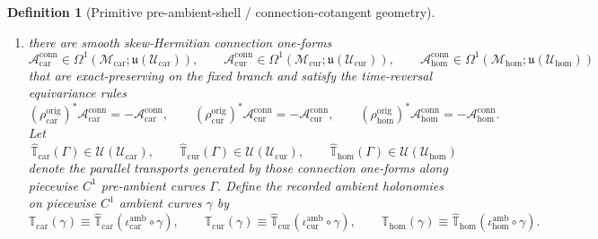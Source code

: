 \documentclass[11pt]{article}
\newcommand{\RootTensorClass}{\mathscr U_{\mathrm{car}}}
\newcommand{\RootRelabelClass}{\mathscr U_{\mathrm{cur}}}
\newcommand{\RootFreeClass}{\mathscr U_{\mathrm{hom}}}
\newcommand{\TensorAmbientLiouville}{\boldsymbol{\Lambda}_{\mathrm{car}}}
\newcommand{\CurAmbientLiouville}{\boldsymbol{\Lambda}_{\mathrm{cur}}}
\newcommand{\HomAmbientLiouville}{\boldsymbol{\Lambda}_{\mathrm{hom}}}
\newcommand{\TensorAmbientTwo}{\boldsymbol{\Xi}_{\mathrm{car}}}
\newcommand{\CurAmbientTwo}{\boldsymbol{\Xi}_{\mathrm{cur}}}
\newcommand{\HomAmbientTwo}{\boldsymbol{\Xi}_{\mathrm{hom}}}
\newcommand{\TensorAmbientTransport}{\mathbb T_{\mathrm{car}}}
\newcommand{\CurAmbientTransport}{\mathbb T_{\mathrm{cur}}}
\newcommand{\HomAmbientTransport}{\mathbb T_{\mathrm{hom}}}
\newcommand{\TensorOriginSpace}{\mathcal M_{\mathrm{car}}}
\newcommand{\CurOriginSpace}{\mathcal M_{\mathrm{cur}}}
\newcommand{\HomOriginSpace}{\mathcal M_{\mathrm{hom}}}
\newcommand{\TensorOriginTimeRev}{\rho_{\mathrm{car}}^{\mathrm{orig}}}
\newcommand{\CurOriginTimeRev}{\rho_{\mathrm{cur}}^{\mathrm{orig}}}
\newcommand{\HomOriginTimeRev}{\rho_{\mathrm{hom}}^{\mathrm{orig}}}
\newcommand{\TensorAmbientInc}{\iota_{\mathrm{car}}^{\mathrm{amb}}}
\newcommand{\CurAmbientInc}{\iota_{\mathrm{cur}}^{\mathrm{amb}}}
\newcommand{\HomAmbientInc}{\iota_{\mathrm{hom}}^{\mathrm{amb}}}
\newcommand{\HomOriginCotangentRealization}{\widehat\Psi_{\mathrm{hom}}}
\newcommand{\TensorOriginLiouville}{\boldsymbol{\Lambda}_{\mathrm{car}}^{\mathrm{orig}}}
\newcommand{\CurOriginLiouville}{\boldsymbol{\Lambda}_{\mathrm{cur}}^{\mathrm{orig}}}
\newcommand{\HomOriginLiouville}{\boldsymbol{\Lambda}_{\mathrm{hom}}^{\mathrm{orig}}}
\newcommand{\TensorOriginTwo}{\boldsymbol{\Xi}_{\mathrm{car}}^{\mathrm{orig}}}
\newcommand{\CurOriginTwo}{\boldsymbol{\Xi}_{\mathrm{cur}}^{\mathrm{orig}}}
\newcommand{\HomOriginTwo}{\boldsymbol{\Xi}_{\mathrm{hom}}^{\mathrm{orig}}}
\newcommand{\TensorConnectionForm}{\mathcal A_{\mathrm{car}}^{\mathrm{conn}}}
\newcommand{\CurConnectionForm}{\mathcal A_{\mathrm{cur}}^{\mathrm{conn}}}
\newcommand{\HomConnectionForm}{\mathcal A_{\mathrm{hom}}^{\mathrm{conn}}}
\newcommand{\TensorOriginTransport}{\widehat{\mathbb T}_{\mathrm{car}}}
\newcommand{\CurOriginTransport}{\widehat{\mathbb T}_{\mathrm{cur}}}
\newcommand{\HomOriginTransport}{\widehat{\mathbb T}_{\mathrm{hom}}}
\newcommand{\LieU}{\mathfrak u}
\newtheorem{definition}{Definition}
\begin{document}
\begin{definition}[Primitive pre-ambient-shell / connection-cotangent geometry]
\begin{enumerate}
\begin{equation}
    \HomOriginLiouville\equiv{\HomOriginCotangentRealization}^*\theta_{\mathrm{can}},
    \label{eq:origin_liouville}
    \end{equation}
    \begin{equation}
    \TensorOriginTwo\equiv d\TensorOriginLiouville,\qquad
    \CurOriginTwo\equiv d\CurOriginLiouville,\qquad
    \HomOriginTwo\equiv d\HomOriginLiouville.
    \label{eq:origin_two}
    \end{equation}
    Assume
    \[
    (\TensorOriginTimeRev)^*\TensorOriginLiouville=-\TensorOriginLiouville,\qquad
    (\CurOriginTimeRev)^*\CurOriginLiouville=-\CurOriginLiouville,\qquad
    (\HomOriginTimeRev)^*\HomOriginLiouville=-\HomOriginLiouville.
    \]
    Define the recorded ambient Liouville one-forms and closed two-forms by ambient restriction:
    \begin{equation}
    \TensorAmbientLiouville\equiv(\TensorAmbientInc)^*\TensorOriginLiouville,\qquad
    \CurAmbientLiouville\equiv(\CurAmbientInc)^*\CurOriginLiouville,\qquad
    \HomAmbientLiouville\equiv(\HomAmbientInc)^*\HomOriginLiouville,
    \label{eq:ambient_liouville_from_origin}
    \end{equation}
    \begin{equation}
    \TensorAmbientTwo\equiv(\TensorAmbientInc)^*\TensorOriginTwo,\qquad
    \CurAmbientTwo\equiv(\CurAmbientInc)^*\CurOriginTwo,\qquad
    \HomAmbientTwo\equiv(\HomAmbientInc)^*\HomOriginTwo.
    \label{eq:ambient_two_from_origin}
    \end{equation}
    \item there are smooth skew-Hermitian connection one-forms
    \[
    \TensorConnectionForm\in\Omega^1(\TensorOriginSpace;\LieU(\RootTensorClass)),\qquad
    \CurConnectionForm\in\Omega^1(\CurOriginSpace;\LieU(\RootRelabelClass)),\qquad
    \HomConnectionForm\in\Omega^1(\HomOriginSpace;\LieU(\RootFreeClass))
    \]
    that are exact-preserving on the fixed branch and satisfy the time-reversal equivariance rules
    \[
    (\TensorOriginTimeRev)^*\TensorConnectionForm=-\TensorConnectionForm,\qquad
    (\CurOriginTimeRev)^*\CurConnectionForm=-\CurConnectionForm,\qquad
    (\HomOriginTimeRev)^*\HomConnectionForm=-\HomConnectionForm.
    \]
    Let
    \[
    \TensorOriginTransport(\Gamma)\in\mathcal U(\RootTensorClass),\qquad
    \CurOriginTransport(\Gamma)\in\mathcal U(\RootRelabelClass),\qquad
    \HomOriginTransport(\Gamma)\in\mathcal U(\RootFreeClass)
    \]
    denote the parallel transports generated by those connection one-forms along piecewise \(C^1\) pre-ambient curves \(\Gamma\). Define the recorded ambient holonomies on piecewise \(C^1\) ambient curves \(\gamma\) by
    \begin{equation}
    \TensorAmbientTransport(\gamma)\equiv\TensorOriginTransport(\TensorAmbientInc\circ\gamma),\qquad
    \CurAmbientTransport(\gamma)\equiv\CurOriginTransport(\CurAmbientInc\circ\gamma),\qquad
    \HomAmbientTransport(\gamma)\equiv\HomOriginTransport(\HomAmbientInc\circ\gamma).
    \label{eq:ambient_transport_from_origin}
    \end{equation}
\end{enumerate}


\end{definition}
\end{document}
